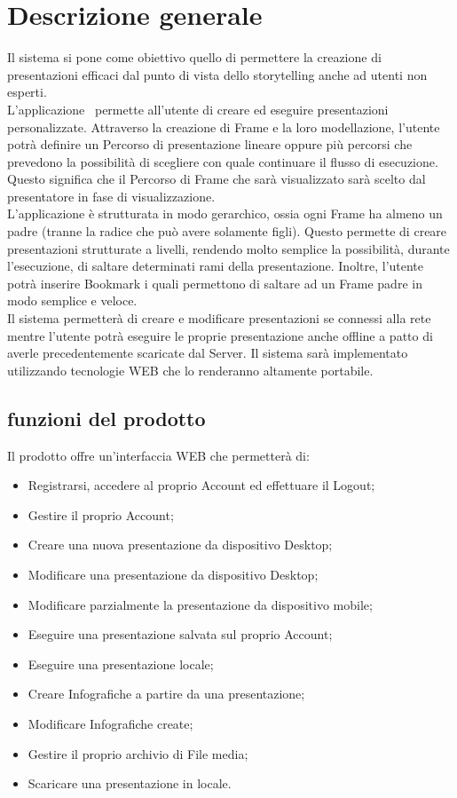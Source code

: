 \section{Descrizione generale}{
Il sistema si pone come obiettivo quello di permettere la creazione di presentazioni efficaci dal punto di vista dello storytelling anche ad utenti non esperti. \\
L'applicazione \premi\ permette all'utente di creare ed eseguire presentazioni personalizzate. Attraverso la creazione di Frame e la loro modellazione, l'utente potrà definire un Percorso di presentazione lineare oppure più percorsi che prevedono la possibilità di scegliere con quale continuare il flusso di esecuzione. Questo significa che il Percorso di Frame che sarà visualizzato sarà scelto dal presentatore in fase di visualizzazione.\\
L'applicazione è strutturata in modo gerarchico, ossia ogni Frame ha almeno un padre (tranne la radice che può avere solamente figli). Questo permette di creare presentazioni strutturate a livelli, rendendo molto semplice la possibilità, durante l'esecuzione, di saltare determinati rami della presentazione. Inoltre, l'utente potrà inserire Bookmark i quali permettono di saltare ad un Frame padre in modo semplice e veloce.\\
Il sistema permetterà di creare e modificare presentazioni se connessi alla rete mentre l'utente potrà eseguire le proprie presentazione anche offline a patto di averle precedentemente scaricate dal Server.
Il sistema sarà implementato utilizzando tecnologie WEB che lo renderanno altamente portabile.

\subsection{funzioni del prodotto}{
	Il prodotto offre un'interfaccia WEB che permetterà di:
	\begin{itemize}
		\item Registrarsi, accedere al proprio Account ed effettuare il Logout;
		\item Gestire il proprio Account;
		\item Creare una nuova presentazione da dispositivo Desktop;
		\item Modificare una presentazione da dispositivo Desktop;
		\item Modificare parzialmente la presentazione da dispositivo mobile;
		\item Eseguire una presentazione salvata sul proprio Account;
		\item Eseguire una presentazione locale;
		\item Creare Infografiche a partire da una presentazione;
		\item Modificare Infografiche create;
		\item Gestire il proprio archivio di File media;
		\item Scaricare una presentazione in locale.
	\end{itemize}
}
}
